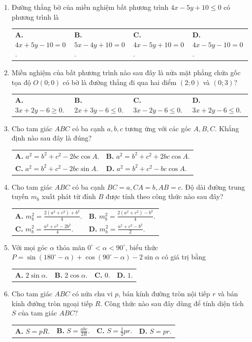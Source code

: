 \documentclass[12pt,a4paper]{article}
\makeatletter
\newcommand{\four}[4]{\par\noindent\begin{tabularx}{\linewidth}{@{}*{4}{>{\raggedright\arraybackslash}X}@{}}\textbf{A.} #1&\textbf{B.} #2&\textbf{C.} #3&\textbf{D.} #4\end{tabularx}}
\newcommand{\two}[4]{\par\noindent\begin{tabularx}{\linewidth}{@{}*{2}{>{\raggedright\arraybackslash}X}@{}}\textbf{A.} #1&\textbf{B.} #2\\[1pt]\textbf{C.} #3&\textbf{D.} #4\end{tabularx}}
\makeatother
\begin{document}
\begin{enumerate}
\item Đường thẳng bờ của miền nghiệm bất phương trình $4x - 5y + 10 \le 0$ có phương trình là
\four{$4x + 5y - 10 = 0$.}{$5x - 4y + 10 = 0$.}{$4x - 5y + 10 = 0$.}{$4x - 5y - 10 = 0$.}

\item Miền nghiệm của bất phương trình nào sau đây là nửa mặt phẳng chứa gốc tọa độ $O(0; 0)$ có bờ là đường thẳng đi qua hai điểm $(2; 0)$ và $(0; 3)$?
\four{$3x + 2y - 6 \ge 0$.}{$2x + 3y - 6 \le 0$.}{$3x - 2y - 6 \le 0$.}{$3x + 2y - 6 \le 0$.}

\item Cho tam giác $ABC$ có ba cạnh $a, b, c$ tương ứng với các góc $A, B, C$. Khẳng định nào sau đây là đúng?
\two{$a^2 = b^2 + c^2 - 2bc \cos A$.}{$a^2 = b^2 + c^2 + 2bc \cos A$.}{$a^2 = b^2 + c^2 - 2bc \sin A$.}{$a^2 = b^2 + c^2 - bc \cos A$.}

\item Cho tam giác $ABC$ có ba cạnh $BC = a, CA = b, AB = c$. Độ dài đường trung tuyến $m_b$ xuất phát từ đỉnh $B$ được tính theo công thức nào sau đây?
\two{$m_b^2 = \frac{2(a^2 + c^2) + b^2}{4}$.}{$m_b^2 = \frac{2(a^2 + c^2) - b^2}{4}$.}{$m_b^2 = \frac{a^2 + c^2 - 2b^2}{4}$.}{$m_b^2 = \frac{a^2 + c^2 - b^2}{2}$.}

\item Với mọi góc $\alpha$ thỏa mãn $0^\circ < \alpha < 90^\circ$, biểu thức $P = \sin(180^\circ - \alpha) + \cos(90^\circ - \alpha) - 2\sin \alpha$ có giá trị bằng
\four{$2\sin \alpha$.}{$2\cos \alpha$.}{$0$.}{$1$.}

\item Cho tam giác $ABC$ có nửa chu vi $p$, bán kính đường tròn nội tiếp $r$ và bán kính đường tròn ngoại tiếp $R$. Công thức nào sau đây dùng để tính diện tích $S$ của tam giác $ABC$?
\four{$S = p R$.}{$S = \frac{abc}{2R}$.}{$S = \frac{1}{2} p r$.}{$S = p r$.}
\end{enumerate}
\newpage
\end{document}
